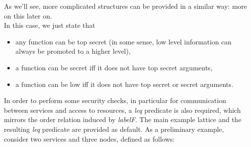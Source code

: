 \documentclass[../DraftNotes.tex]{subfiles}
\begin{document}
As we'll see, more complicated structures can be provided in a similar way: more on this later on. \\
In this case, we just state that
\begin{itemize}
	\item any function can be top secret (in some sense, low level information can always be promoted to a higher level),
	\item a function can be secret iff it does not have top secret arguments,
	\item a function can be low iff it does not have top secret or secret arguments.
\end{itemize}

In order to perform some security checks, in particular for communication between services and access to resources, a \emph{leq} predicate is also required, which mirrors the order relation induced by \emph{labelF}. The main example lattice and the resulting \emph{leq} predicate are provided as default.
\smallskip
As a preliminary example, consider two services and three nodes, defined as follows:
\begin{verbatim}
	
\end{verbatim}
\end{document}
